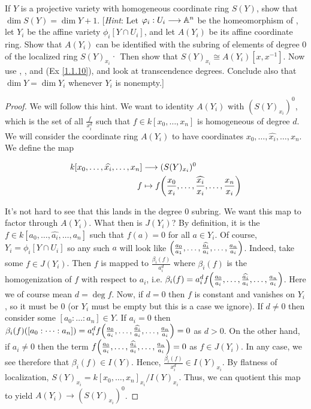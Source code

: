 \label{1.2.6}

If $Y$ is a projective variety with homogeneous coordinate ring $S(Y)$, show that
$\dim S(Y) = \dim Y + 1$. [\textit{Hint}: Let $\varphi_i: U_i \longrightarrow \mathbb A^n$ be the homeomorphism of \cite[2.2]{hartshorne},
let $Y_i$ be the affine variety $\phi_i[Y \cap U_i]$, and let $A(Y_i)$ be its affine coordinate ring. Show that $A(Y_i)$ can be identified with the subring of elements of degree $0$ of the
localized ring $S(Y)_{x_i}$· Then show that $S(Y)_{x_i} \cong A(Y_i)[x, x^{-1}]$. Now use \cite[1.7]{hartshorne},
\cite[1.8A]{hartshorne}, and (Ex \ref{1.1.10}), and look at transcendence degrees. Conclude also that $\dim Y = \dim Y_i$ whenever $Y_i$ is nonempty.]

\begin{proof}
    We will follow this hint. We want to identity $A(Y_i)$ with $(S(Y)_{x_i})^0$, which is the set of all $\frac{f}{x_i^d}$ such that $f \in k[x_0, \dots, x_n]$ is homogeneous of degree $d$. We will consider the coordinate ring $A(Y_i)$ to have coordinates $x_0, \dots, \widehat{x_i}, \dots, x_n$. We define the map

    \begin{align*}
        k[x_0, \dots, \widehat{x_i}, \dots, x_n] &\longrightarrow (S(Y)_{x_i})^0\\
        f &\mapsto f{\left(\frac{x_0}{x_i}, \dots, \widehat{\frac{x_i}{x_i}}, \dots, \frac{x_n}{x_i}\right)}
    \end{align*}

    It's not hard to see that this lands in the degree $0$ subring. We want this map to factor through $A(Y_i)$. What then is $J(Y_i)$? By definition, it is the $f \in k[a_0, \dots, \widehat{a_i}, \dots, a_n]$ such that $f(a) = 0$ for all $a \in Y_i$. Of course, $Y_i = \phi_i[Y \cap U_i]$ so any such $a$ will look like ${\left(\frac{a_0}{a_1}, \dots, \widehat{\frac{a_i}{a_i}}, \dots, \frac{a_n}{a_i}\right)}$. Indeed, take some $f \in J(Y_i)$. Then $f$ is mapped to $\frac{\beta_i(f)}{a_i^d}$ where $\beta_i(f)$ is the homogenization of $f$ with respect to $a_i$, i.e. $\beta_i(f) = a_i^d f{\left(\frac{a_0}{a_i}, \dots, \widehat{\frac{a_i}{a_i}}, \dots, \frac{a_n}{a_i}\right)}$. Here  we of course mean $d = \deg f$. Now, if $d = 0$ then $f$ is constant and vanishes on $Y_i$, so it must be $0$ (or $Y_i$ must be empty but this is a case we ignore). If $d \neq 0$ then consider some $[a_0 : \dots : a_n] \in Y$. If $a_i = 0$ then $\beta_i(f)([a_0 : \dots : a_n]) = a_i^d f{\left(\frac{a_0}{a_i}, \dots, \widehat{\frac{a_i}{a_i}}, \dots, \frac{a_n}{a_i}\right)} = 0$ as $d > 0$. On the other hand, if $a_i \neq 0$ then the term $f{\left(\frac{a_0}{a_i}, \dots, \widehat{\frac{a_i}{a_i}}, \dots, \frac{a_n}{a_i}\right)} = 0$ as $f \in J(Y_i)$. In any case, we see therefore that $\beta_i(f) \in I(Y)$. Hence, $\frac{\beta_i(f)}{x_i^d} \in I(Y)_{x_i}$. By flatness of localization, $S(Y)_{x_i} = k[x_0, \dots, x_n]_{x_i} / I(Y)_{x_i}$. Thus, we can quotient this map to yield $A(Y_i) \longrightarrow (S(Y)_{x_i})^0$. 


\end{proof}
